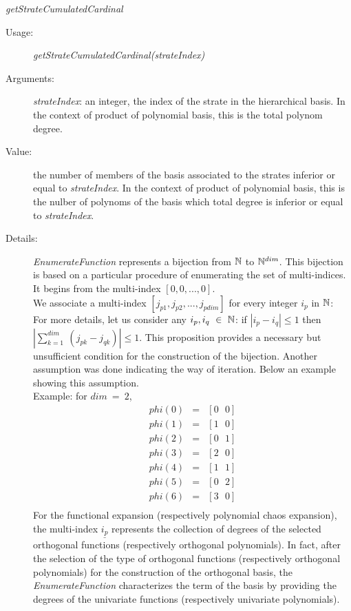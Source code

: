 \begin{description}
\bigskip
\item \textit{getStrateCumulatedCardinal}
\begin{description}
\item[Usage:] \textit{getStrateCumulatedCardinal(strateIndex)}
\item[Arguments:] \textit{strateIndex}: an integer, the index of the strate in the hierarchical basis. In the context of product of polynomial basis, this is the total polynom degree.
\item[Value:] the number of members of the basis associated to the  strates inferior or equal to \textit{strateIndex}. In the context of product of polynomial basis, this is the nulber of polynoms of the basis which total degree is inferior or equal to \textit{strateIndex}.
\end{description}

\end{description}
\begin{description}

\item[Details:] \textit{EnumerateFunction} represents a bijection from ${\mathbb N}$ to ${\mathbb N}^{dim}$. This bijection is based on a particular procedure of enumerating the set of multi-indices. It begins from the multi-index $[0,0,...,0]$. \\We associate a multi-index $[j_{p1}, j_{p2},..., j_{pdim}]$ for every integer $i_p$ in ${\mathbb N}$: \\ For more details, let us consider any $i_p, i_q~\in~{\mathbb N}$: if $|i_p-i_q|\leq 1$ then $|\sum_{k=1}^{dim}~(j_{pk}- j_{qk})| \leq 1$. This proposition provides a necessary but unsufficient condition for the construction of the bijection. Another assumption was done indicating the way of iteration. Below an example showing this assumption.\\
Example:
for $dim~=~2$,
\begin{eqnarray*}
phi(0) &=& [0~~~0] \\
phi(1) &=& [1~~~0] \\
phi(2) &=& [0~~~1] \\
phi(3) &=& [2~~~0] \\
phi(4) &=& [1~~~1] \\
phi(5) &=& [0~~~2] \\
phi(6) &=& [3~~~0] \\
\end{eqnarray*}
For the functional expansion (respectively polynomial chaos expansion), the multi-index $\underline{i_p}$ represents the collection of degrees of the selected orthogonal functions (respectively orthogonal polynomials). In fact, after the selection of the type of orthogonal functions (respectively orthogonal polynomials) for the construction of the orthogonal basis, the \textit{EnumerateFunction} characterizes the term of the basis by providing the degrees of the univariate functions (respectively univariate polynomials).

\end{description}


